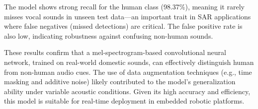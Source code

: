 The model shows strong recall for the human class (98.37\%), meaning it rarely misses vocal sounds in unseen test data—an important trait in SAR applications where false negatives (missed detections) are critical. The false positive rate is also low, indicating robustness against confusing non-human sounds.

These results confirm that a mel-spectrogram-based convolutional neural network, trained on real-world domestic sounds, can effectively distinguish human from non-human audio cues. The use of data augmentation techniques (e.g., time masking and additive noise) likely contributed to the model's generalization ability under variable acoustic conditions. Given its high accuracy and efficiency, this model is suitable for real-time deployment in embedded robotic platforms.